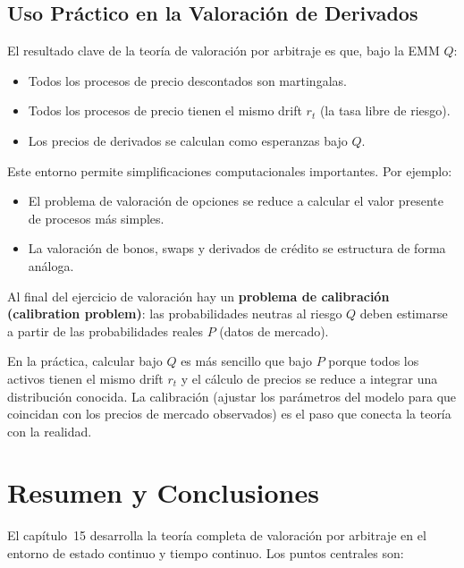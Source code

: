 \documentclass[12pt]{article}
\begin{document}
\subsection{Uso Pr\'actico en la Valoraci\'on de Derivados}

El resultado clave de la teor\'ia de valoraci\'on por arbitraje es que, bajo la EMM $Q$:
\begin{itemize}
  \item Todos los procesos de precio descontados son martingalas.
  \item Todos los procesos de precio tienen el mismo drift $r_t$ (la tasa libre de riesgo).
  \item Los precios de derivados se calculan como esperanzas bajo $Q$.
\end{itemize}

Este entorno permite simplificaciones computacionales importantes. Por ejemplo:
\begin{itemize}
  \item El problema de valoraci\'on de opciones se reduce a calcular el valor presente de procesos m\'as simples.
  \item La valoraci\'on de bonos, swaps y derivados de cr\'edito se estructura de forma an\'aloga.
\end{itemize}

Al final del ejercicio de valoraci\'on hay un \textbf{problema de calibraci\'on (calibration problem)}: las probabilidades neutras al riesgo $Q$ deben estimarse a partir de las probabilidades reales $P$ (datos de mercado).

\begin{intuicion}
En la pr\'actica, calcular bajo $Q$ es m\'as sencillo que bajo $P$ porque todos los activos tienen el mismo drift $r_t$ y el c\'alculo de precios se reduce a integrar una distribuci\'on conocida. La calibraci\'on (ajustar los par\'ametros del modelo para que coincidan con los precios de mercado observados) es el paso que conecta la teor\'ia con la realidad.
\end{intuicion}

\section{Resumen y Conclusiones}

El cap\'itulo~15 desarrolla la teor\'ia completa de valoraci\'on por arbitraje en el entorno de estado continuo y tiempo continuo. Los puntos centrales son:
\end{document}

